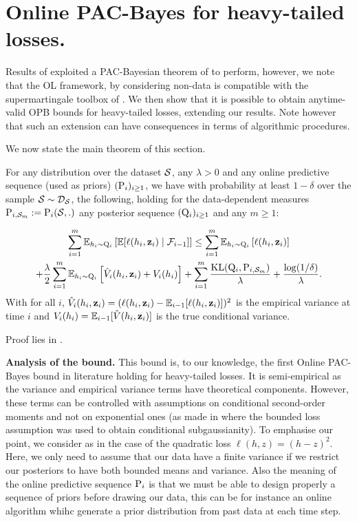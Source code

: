 \section{Online PAC-Bayes for heavy-tailed losses.}
\label{sec: heavy-tailed}

Results of  exploited a PAC-Bayesian theorem of \citet{rivasplata2020pac} to perform, however, we note that the OL framework, by considering non-\iid data is compatible with the supermartingale toolbox of . We then show that it is possible to obtain anytime-valid OPB bounds for heavy-tailed losses, extending our results. Note however that such an extension can have consequences in terms of algorithmic procedures.

We now state the main theorem of this section.

\begin{theorem}
  \label{th: opb-ht}
  For any distribution over the dataset $\S$, any $\lambda>0$ and any online predictive sequence (used as priors) $(\P_{i})_{i\geq 1}$, we have with probability at least $1-\delta$ over the sample $\S\sim\D_{\S}$, the following, holding for the data-dependent measures $\P_{i,\Sm}:= \P_{i}(\S,.)$ any posterior sequence $(\Q_{i})_{i\geq 1}$ and any $m\geq 1$:

  \begin{multline*}
     \sum_{i=1}^m \mathbb{E}_{h_i\sim \Q_{i}}\left[ \mathbb{E}[\ell(h_i,\z_i) \mid \mathcal{F}_{i-1}]    \right]  \leq \sum_{i=1}^m \mathbb{E}_{h_i\sim \Q_{i}}\left[ \ell(h_i,\z_i) \right] \\+\frac{\lambda}{2}\sum_{i=1}^m \mathbb{E}_{h_i\sim \Q_{i}}\left[ \hat{V}_i(h_i,\z_i) + V_i(h_i) \right]
     + \sum_{i=1}^m\frac{\operatorname{KL}(\Q_{i}, \P_{i,\Sm})}{\lambda}  + \frac{\log(1/\delta)}{\lambda}.
  \end{multline*}
  With for all $i$, $\hat{V}_i(h_i,\z_i)= (\ell(h_i,\z_i)-\mathbb{E}_{i-1}[\ell(h_i,\z_i)])^2$ is the empirical variance at time $i$ and $V_i(h_i)= \mathbb{E}_{i-1}[\hat{V}(h_i,\z_i)]$ is the true conditional variance.
\end{theorem}

Proof lies in .

\textbf{Analysis of the bound.} This bound is, to our knowledge, the first Online PAC-Bayes bound in literature holding for heavy-tailed losses. It is semi-empirical as the variance and empirical variance terms have theoretical components. However, these terms can be controlled with assumptions on conditional second-order moments and not on exponential ones (as made in  where the bounded loss assumption was used to obtain conditional subgaussianity). To emphasise our point, we consider as in  the case of the quadratic loss $\ell(h,z)= (h-z)^2$. Here, we only need to assume that our data have a finite variance if we restrict our posteriors to have both bounded means and variance. Also the meaning of the online predictive sequence $\P_{i}$ is that we must be able to design properly a sequence of priors before drawing our data, this can be for instance an online algorithm whihc generate a prior distribution from past data at each time step.

